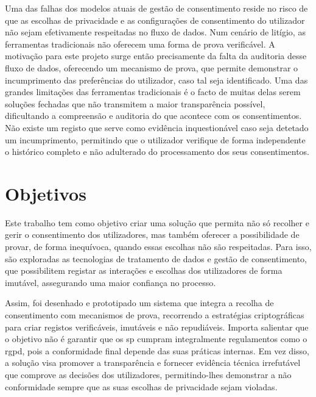 Uma das falhas dos modelos atuais de gestão de consentimento reside no risco de que as escolhas de privacidade e as configurações de consentimento do utilizador não sejam efetivamente respeitadas no fluxo de dados. Num cenário de litígio, as ferramentas tradicionais não oferecem uma forma de prova verificável.
A motivação para este projeto surge então precisamente da falta da auditoria desse fluxo de dados, oferecendo um mecanismo de prova, que permite demonstrar o incumprimento das preferências do utilizador, caso tal seja identificado.
Uma das grandes limitações das ferramentas tradicionais é o facto de muitas delas serem soluções fechadas que não transmitem a maior transparência possível, dificultando a compreensão e auditoria do que acontece com os consentimentos.
Não existe um registo que serve como evidência inquestionável caso seja detetado um incumprimento, permitindo que o utilizador verifique de forma independente o histórico completo e não adulterado do processamento dos seus consentimentos.

\section{Objetivos}

Este trabalho tem como objetivo criar uma solução que permita não só recolher e gerir o consentimento dos utilizadores, mas também oferecer a possibilidade de provar, de forma inequívoca, quando essas escolhas não são respeitadas.
Para isso, são exploradas as tecnologias de tratamento de dados e gestão de consentimento, que possibilitem registar as interações e escolhas dos utilizadores de forma imutável, assegurando uma maior confiança no processo.

Assim, foi desenhado e prototipado um sistema que integra a recolha de consentimento com mecanismos de prova, recorrendo a estratégias criptográficas para criar registos verificáveis, imutáveis e não repudiáveis.
Importa salientar que o objetivo não é garantir que os \acrfull{sp} cumpram integralmente regulamentos como o \acrshort{rgpd}, pois a conformidade final depende das suas práticas internas.
Em vez disso, a solução visa promover a transparência e fornecer evidência técnica irrefutável que comprove as decisões dos utilizadores, permitindo-lhes demonstrar a não conformidade sempre que as suas escolhas de privacidade sejam violadas.

